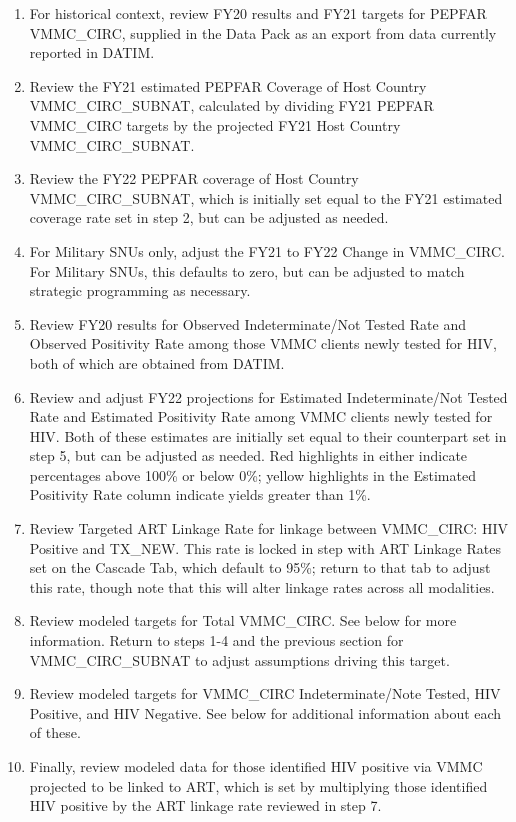 \documentclass[
  openany]{book}
\begin{document}
\begin{enumerate}
\def\labelenumi{\arabic{enumi}.}
\item
  For historical context, review FY20 results and FY21 targets for
  PEPFAR VMMC\_CIRC, supplied in the Data Pack as an export from data
  currently reported in DATIM.
\item
  Review the FY21 estimated PEPFAR Coverage of Host Country
  VMMC\_CIRC\_SUBNAT, calculated by dividing FY21 PEPFAR VMMC\_CIRC
  targets by the projected FY21 Host Country VMMC\_CIRC\_SUBNAT.
\item
  Review the FY22 PEPFAR coverage of Host Country VMMC\_CIRC\_SUBNAT,
  which is initially set equal to the FY21 estimated coverage rate set
  in step 2, but can be adjusted as needed.
\item
  For Military SNUs only, adjust the FY21 to FY22 Change in VMMC\_CIRC.
  For Military SNUs, this defaults to zero, but can be adjusted to
  match strategic programming as necessary.
\item
  Review FY20 results for Observed Indeterminate/Not Tested Rate and
  Observed Positivity Rate among those VMMC clients newly tested for
  HIV, both of which are obtained from DATIM.
\item
  Review and adjust FY22 projections for Estimated Indeterminate/Not
  Tested Rate and Estimated Positivity Rate among VMMC clients newly
  tested for HIV. Both of these estimates are initially set equal to
  their counterpart set in step 5, but can be adjusted as needed. Red
  highlights in either indicate percentages above 100\% or below 0\%;
  yellow highlights in the Estimated Positivity Rate column indicate
  yields greater than 1\%.
\item
  Review Targeted ART Linkage Rate for linkage between VMMC\_CIRC: HIV
  Positive and TX\_NEW. This rate is locked in step with ART Linkage
  Rates set on the Cascade Tab, which default to 95\%; return to that
  tab to adjust this rate, though note that this will alter linkage
  rates across all modalities.
\item
  Review modeled targets for Total VMMC\_CIRC. See below for more
  information. Return to steps 1-4 and the previous section for
  VMMC\_CIRC\_SUBNAT to adjust assumptions driving this target.
\item
  Review modeled targets for VMMC\_CIRC Indeterminate/Note Tested, HIV
  Positive, and HIV Negative. See below for additional information
  about each of these.
\item
  Finally, review modeled data for those identified HIV positive via
  VMMC projected to be linked to ART, which is set by multiplying
  those identified HIV positive by the ART linkage rate reviewed in
  step 7.
\end{enumerate}
\end{document}

